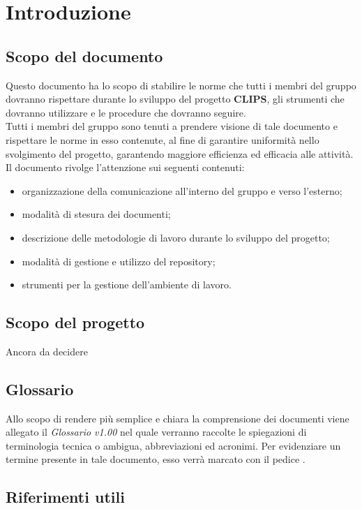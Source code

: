 \documentclass[../NormeProgetto.tex]{subfiles}
\begin{document}
\section{Introduzione}
	\subsection{Scopo del documento}
	Questo documento ha lo scopo di stabilire le norme che tutti i membri del gruppo \leaf dovranno rispettare durante lo sviluppo del progetto \textbf{CLIPS}, gli strumenti che dovranno utilizzare e le procedure che dovranno seguire. \\
	Tutti i membri del gruppo sono tenuti a prendere visione di tale documento e rispettare le norme in esso contenute, al fine di garantire uniformità nello svolgimento del progetto, garantendo maggiore efficienza ed efficacia alle attività. \\
	Il documento rivolge l'attenzione sui seguenti contenuti:
	\begin{itemize}
	\item organizzazione della comunicazione all'interno del gruppo e verso l'esterno;
	\item modalità di stesura dei documenti;
	\item descrizione delle metodologie di lavoro durante lo sviluppo del progetto;
	\item modalità di gestione e utilizzo del repository\g;
	\item strumenti per la gestione dell'ambiente di lavoro.
	\end{itemize}

	\subsection{Scopo del progetto}
	Ancora da decidere
	
	\subsection{Glossario} 
	Allo scopo di rendere più semplice e chiara la comprensione dei documenti viene allegato il \textit{Glossario v1.00} nel quale verranno raccolte le spiegazioni di  terminologia tecnica o  ambigua,
abbreviazioni ed acronimi. Per evidenziare un termine presente in tale documento, esso verrà marcato con il pedice \g.
	
	\subsection{Riferimenti utili}
\end{document}
